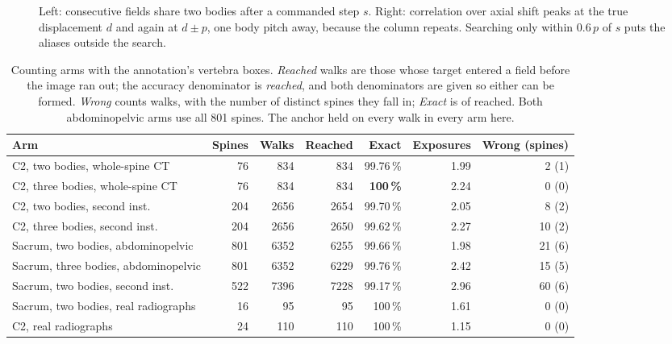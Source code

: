 \documentclass[11pt,letterpaper]{article}
\newcommand{\pc}[1]{#1\,\%}
\begin{document}
\begin{figure}[htbp]
\begin{tikzpicture}[x=1cm,y=1cm]
\end{tikzpicture}
\caption{Left: consecutive fields share two bodies after a commanded step $s$. Right: correlation over
axial shift peaks at the true displacement $d$ and again at $d\pm p$, one body pitch away, because the
column repeats. Searching only within $0.6\,p$ of $s$ puts the aliases outside the search.}
\label{fig:mechanism}
\end{figure}

\begin{table}[htbp]\centering
\caption{Counting arms with the annotation's vertebra boxes. \emph{Reached} walks are those whose target
entered a field before the image ran out; the accuracy denominator is \emph{reached}, and both denominators
are given so either can be formed. \emph{Wrong} counts walks, with the number of distinct spines they fall
in; \emph{Exact} is of reached. Both abdominopelvic arms use all 801 spines. The anchor held on every walk in every arm here.}
\label{tab:count}
\footnotesize\setlength{\tabcolsep}{4.5pt}
\begin{tabular}{l r r r r r r}
\toprule
Arm & Spines & Walks & Reached & Exact & Exposures & Wrong (spines)\\
\midrule
C2, two bodies, whole-spine CT & 76 & 834 & 834 & \pc{99.76} & 1.99 & 2 (1)\\
C2, three bodies, whole-spine CT & 76 & 834 & 834 & \textbf{\pc{100}} & 2.24 & 0 (0)\\
C2, two bodies, second inst. & 204 & 2656 & 2654 & \pc{99.70} & 2.05 & 8 (2)\\
C2, three bodies, second inst. & 204 & 2656 & 2650 & \pc{99.62} & 2.27 & 10 (2)\\
\midrule
Sacrum, two bodies, abdominopelvic & 801 & 6352 & 6255 & \pc{99.66} & 1.98 & 21 (6)\\
Sacrum, three bodies, abdominopelvic & 801 & 6352 & 6229 & \pc{99.76} & 2.42 & 15 (5)\\
Sacrum, two bodies, second inst. & 522 & 7396 & 7228 & \pc{99.17} & 2.96 & 60 (6)\\
\midrule
Sacrum, two bodies, real radiographs & 16 & 95 & 95 & \pc{100} & 1.61 & 0 (0)\\
C2, real radiographs & 24 & 110 & 110 & \pc{100} & 1.15 & 0 (0)\\
\bottomrule
\end{tabular}
\end{table}
\end{document}
